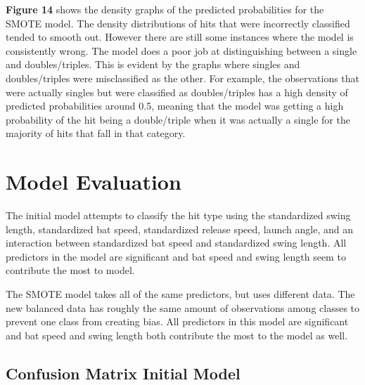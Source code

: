 \documentclass[
  letterpaper,
  DIV=11,
  numbers=noendperiod]{scrartcl}
\begin{document}
\textbf{Figure 14} shows the density graphs of the predicted
probabilities for the SMOTE model. The density distributions of hits
that were incorrectly classified tended to smooth out. However there are
still some instances where the model is consistently wrong. The model
does a poor job at distinguishing between a single and doubles/triples.
This is evident by the graphs where singles and doubles/triples were
misclassified as the other. For example, the observations that were
actually singles but were classified as doubles/triples has a high
density of predicted probabilities around 0.5, meaning that the model
was getting a high probability of the hit being a double/triple when it
was actually a single for the majority of hits that fall in that
category.

\section{Model Evaluation}\label{model-evaluation}

The initial model attempts to classify the hit type using the
standardized swing length, standardized bat speed, standardized release
speed, launch angle, and an interaction between standardized bat speed
and standardized swing length. All predictors in the model are
significant and bat speed and swing length seem to contribute the most
to model.

The SMOTE model takes all of the same predictors, but uses different
data. The new balanced data has roughly the same amount of observations
among classes to prevent one class from creating bias. All predictors in
this model are significant and bat speed and swing length both
contribute the most to the model as well.

\subsection{Confusion Matrix Initial
Model}\label{confusion-matrix-initial-model}
\end{document}

